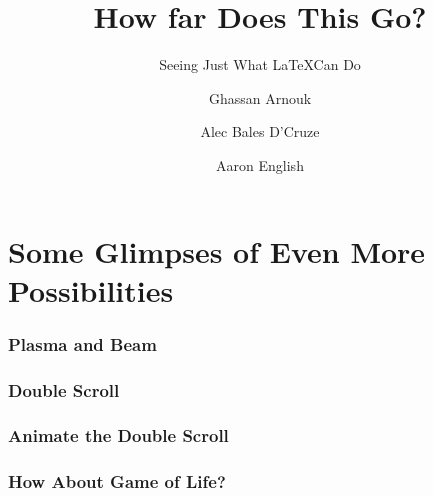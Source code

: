 \documentclass{beamer}
\title{How far Does This Go?}
\subtitle{Seeing Just What \LaTeX Can Do}
\date{\DTMusedate{presentation}}
\author{Ghassan Arnouk \and
        Alec Bales D'Cruze \and
        Aaron English
}
\begin{document}
    \begin{frame}
        \titlepage
    \end{frame}
    \section{Some Glimpses of Even More Possibilities}\label{sct:allRes}
        \begin{frame}
            \frametitle{ Plasma and Beam}
        \end{frame}
        \begin{frame}
            \frametitle{Double Scroll}
        \end{frame}
        \begin{frame}
            \frametitle{Animate the Double Scroll}
        \end{frame}
        \begin{frame}
            \frametitle{How About Game of Life?}
        \end{frame}
\end{document}
